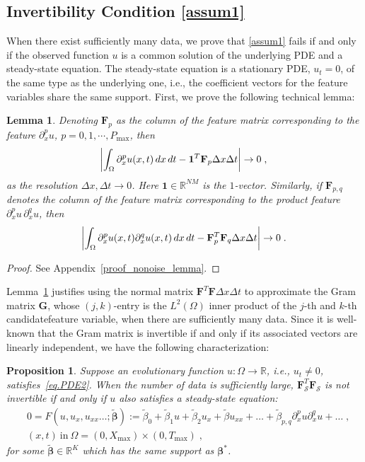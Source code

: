 \documentclass[a4paper,11pt]{article}
\newcommand{\bbeta}{\bm{\beta}}
\newcommand{\bF}{\mathbf{F}}
\newcommand{\mS}{\mathcal{S}}
\newtheorem{lemma}{Lemma}[section]
\newtheorem{prop}{Proposition}[section]
\theoremstyle{definition}
\begin{document}
\subsection{Invertibility Condition \eqref{assum1} }\label{sec.invertibility}
When there exist sufficiently many data, we prove that \eqref{assum1} fails if and only if the observed function $u$ is a common solution of the underlying PDE and a steady-state equation. The steady-state equation is a stationary PDE, $u_t=0$, of the same type as the underlying one, i.e., the coefficient vectors for the feature variables share the same support.   First, we prove the following technical lemma:
\begin{lemma}\label{nonoise_lemma}
Denoting $\bF_p$ as the column of the feature matrix corresponding to the feature $\partial_x^p u$, $p=0,1,\cdots,P_{\max}$, then
\begin{align*}
	\abs{\int_\Omega \partial_x^pu(x,t)\,dx\,dt-\mathbf{1}^T\bF_p\Delta x\Delta t}\to 0\;,
\end{align*}
as the resolution $\Delta x,\Delta t\to 0$. Here $\mathbf{1}\in\mathbb{R}^{NM}$ is the $1$-vector. Similarly, if $\bF_{p,q}$ denotes the column of the feature matrix corresponding to the product feature $\partial_x^pu\,\partial_x^qu$, then
\begin{align*}
	\abs{\int_\Omega\partial_x^pu(x,t)\partial_x^qu(x,t)\,dx\,dt-\bF_{p}^T\bF_{q}\Delta x\Delta t}\to 0\;.
\end{align*}
\end{lemma}
\begin{proof}
See Appendix~\ref{proof_nonoise_lemma}.	
\end{proof}

Lemma~\ref{nonoise_lemma} justifies using the normal matrix $\bF^T\bF\Delta x\Delta t$ to approximate the Gram matrix $\mathbf{G}$, whose $(j,k)$-entry is the $L^2(\Omega)$ inner product of the $j$-th and $k$-th  candidatefeature variable, when there are sufficiently many data. Since it is well-known that the Gram matrix is invertible if and only if its associated vectors are linearly independent, we have the following characterization:
\begin{prop}\label{prop.invert}Suppose an evolutionary function $u:\Omega\to\mathbb{R}$, i.e., $u_t\neq 0$, satisfies~\eqref{eq.PDE2}. When the number of data is sufficiently large,  $\bF_\mS^T\bF_\mS$ is not invertible if and only if $u$  also satisfies a steady-state equation:
\begin{align}
&0= F(u,u_x,u_{xx}\dots;\widetilde{\bbeta}):=\widetilde{\beta}_0+\widetilde{\beta}_1u+\widetilde{\beta}_2u_x+\widetilde{\beta}u_{xx}+\dots+\widetilde{\beta}_{p,q}\partial^p_xu\partial^q_xu+\dots	\;,\nonumber\\
&(x,t)~\text{in}~\Omega = (0,X_{\max})\times(0,T_{\max})\;,\label{eq.PDEtest}
\end{align}
for some  $\widetilde{\bbeta}\in\mathbb{R}^{K}$ which has the same support as $\bbeta^*$.
\end{prop}
\end{document}
